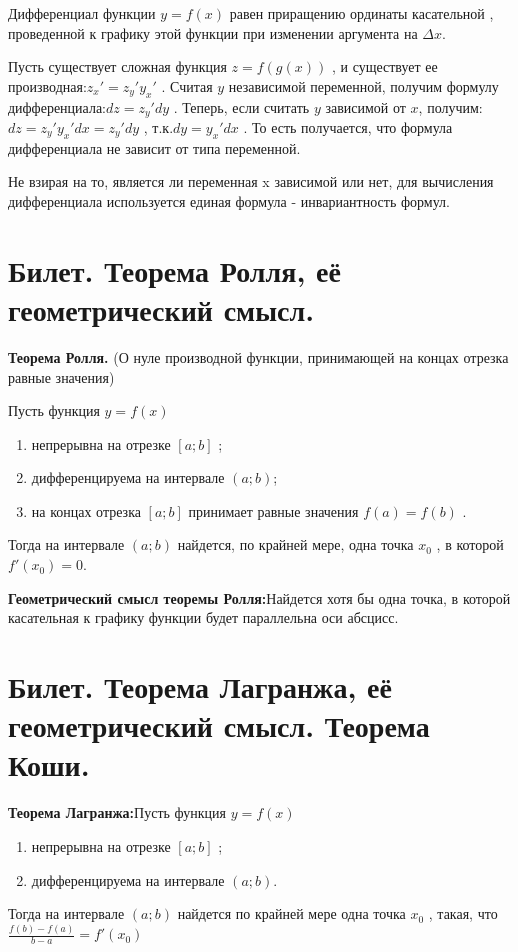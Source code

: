\documentclass[12pt]{article}
\begin{document}
	Дифференциал функции $y = f(x)$ равен приращению ординаты касательной , проведенной к графику этой функции при изменении аргумента на $\Delta x$.
	
	Пусть существует сложная функция $z=f(g(x))$ , и существует ее производная:$z_x'=z_y'y_x'$ . Считая $y$ независимой переменной, получим формулу дифференциала:$dz=z_y'dy$ . Теперь, если считать $y$ зависимой от $x$, получим:$dz=z_y'y_x'dx=z_y'dy$ , т.к.$dy=y_x'dx$ . То есть получается, что формула дифференциала не зависит от типа переменной.
	
	Не взирая на то, является ли переменная x зависимой или нет, для вычисления дифференциала используется единая формула - инвариантность формул.
	
	\section{Билет. Теорема Ролля, её геометрический смысл.}
	
	\textbf{Теорема Ролля.} (О нуле производной функции, принимающей на концах отрезка равные значения)
	
	Пусть функция $y=f(x)$ \begin{enumerate}
	\item непрерывна на отрезке $[a;b]$ ;
	\item дифференцируема на интервале $(a;b)$;
	\item на концах отрезка $[a;b]$ принимает равные значения $f(a)=f(b)$ . \end{enumerate}
	Тогда на интервале $(a;b)$ найдется, по крайней мере, одна точка $x_0$ , в которой $f'(x_0)=0$.
	
	\textbf{Геометрический смысл теоремы Ролля:}Найдется хотя бы одна точка, в которой касательная к графику функции будет параллельна оси абсцисс.
	
	
	
	\section{Билет. Теорема Лагранжа, её геометрический смысл. Теорема Коши.}
	
	\textbf{Теорема Лагранжа:}Пусть функция $y=f(x)$   \begin{enumerate}
	\item непрерывна на отрезке $[a;b]$ ;
	\item дифференцируема на интервале $(a;b)$.  \end{enumerate}
	Тогда на интервале $(a;b)$ найдется по крайней мере одна точка $x_0$ , такая, что $\frac{f(b)-f(a)}{b-a}=f'(x_0)$
	
\end{document}
